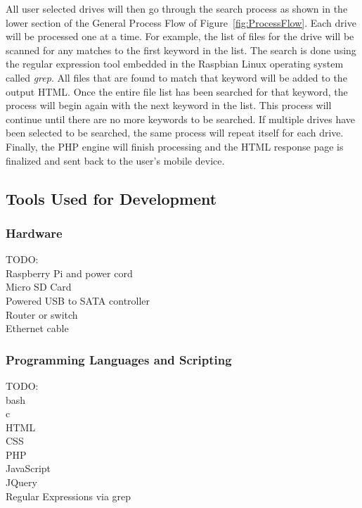 \documentclass[12pt]{article}
\begin{document}
All user selected drives will then go through the search process as
shown in the lower section of the General Process Flow of
Figure~\ref{fig:ProcessFlow}. Each drive will be processed one at a
time. For example, the list of files for the drive will be scanned
for any matches to the first keyword in the list. The search is done
using the regular expression tool embedded in the Raspbian Linux
operating system called {\em grep}. All files that are found to match
that keyword will be added to the output HTML. Once the entire file
list has been searched for that keyword, the process will begin again
with the next keyword in the list. This process will continue until
there are no more keywords to be searched. If multiple drives have
been selected to be searched, the same process will repeat itself
for each drive. Finally, the PHP engine will finish processing and
the HTML response page is finalized and sent back to the user's
mobile device.


\subsection{Tools Used for Development}

\subsubsection{Hardware}

TODO:\\
Raspberry Pi and power cord\\
Micro SD Card\\
Powered USB to SATA controller\\
Router or switch\\
Ethernet cable\\


\subsubsection{Programming Languages and Scripting}

TODO:\\
bash\\
c\\
HTML\\
CSS\\
PHP\\
JavaScript\\
JQuery\\
Regular Expressions via grep\\
\end{document}
